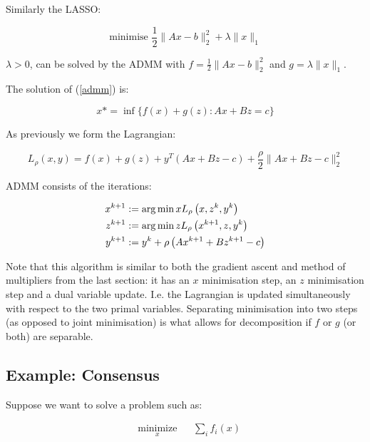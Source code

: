 \documentclass{article}
\begin{document}
\begin{example}
Similarly the LASSO:

\begin{equation}
\text{minimise } \frac{1}{2}\|Ax-b\|_2^2 + \lambda\|x\|_1
\end{equation}

\(\lambda > 0\), can be solved by the ADMM with \(f = \frac{1}{2}\|Ax-b\|_2^2\) and \(g = \lambda\|x\|_1\).

\end{example}

The solution of (\ref{admm}) is:

\begin{equation}
x* = \inf\{f\left( x \right) + g\left(z\right) : Ax +Bz = c\}
\end{equation}

As previously we form the Lagrangian:

\begin{equation}
L_\rho\left(x,y\right) = f\left( x \right) + g\left(z\right) + y^T\left(Ax+Bz-c\right) + \frac{\rho}{2}\|Ax+Bz-c\|_2^2
\end{equation}

ADMM consists of the iterations:

\begin{align}
x^{k+1} &:= \operatorname*{arg\,min}{x} L_\rho\left(x,z^k,y^k\right)\\
z^{k+1} &:= \operatorname*{arg\,min}{z} L_\rho\left(x^{k+1},z,y^k\right)\\
y^{k+1} &:= y^{k} + \rho \left(Ax^{k+1} + Bz^{k+1} - c\right)
\label{admm_algo}
\end{align}

Note that this algorithm is similar to both the gradient ascent and method of multipliers from the last section: it has an \(x\) minimisation step, an \(z\) minimisation step and a dual variable update. I.e. the Lagrangian is updated simultaneously with respect to the two primal variables. Separating minimisation into two steps (as opposed to joint minimisation) is what allows for decomposition if \(f\) or \(g\) (or both) are separable. 

\subsection{Example: Consensus}
Suppose we want to solve a problem such as:

\begin{equation*}
\begin{aligned}
& \underset{x}{\text{minimize}}
& & \sum_i f_i\left( x \right) \\
\label{consensus}
\end{aligned}
\end{equation*}
\end{document}
